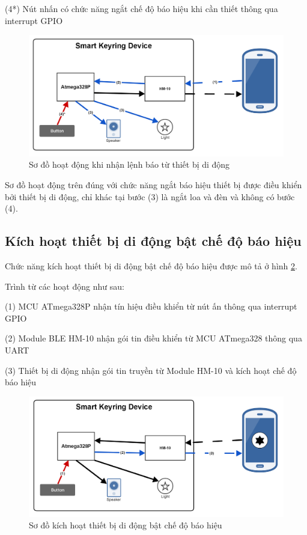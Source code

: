 (4*) Nút nhấn có chức năng ngắt chế độ báo hiệu khi cần thiết thông qua interrupt GPIO

\begin{figure}[h]
	\centering    
	\includegraphics[width=1.0\textwidth]{ring1}
	\caption[Sơ đồ hoạt động khi nhận lệnh báo từ thiết bị di động]{Sơ đồ hoạt động khi nhận lệnh báo từ thiết bị di động}
	\label{fig: ring1}
\end{figure}

Sơ đồ hoạt động trên đúng với chức năng ngắt báo hiệu thiết bị được điều khiển bởi thiết bị di động, chỉ khác tại bước (3) là ngắt loa và đèn và không có bước (4).
\subsection{Kích hoạt thiết bị di động bật chế độ báo hiệu}

Chức năng kích hoạt thiết bị di động bật chế độ báo hiệu được mô tả ở hình \ref{fig: ring2}.

Trình từ các hoạt động như sau:

(1) MCU ATmega328P nhận tín hiệu điều khiển từ nút ấn thông qua interrupt GPIO

(2) Module BLE HM-10 nhận gói tin điều khiển từ MCU ATmega328 thông qua UART

(3) Thiết bị di động nhận gói tin truyền từ Module HM-10 và kích hoạt chế độ báo hiệu

\begin{figure}[h]
	\centering    
	\includegraphics[width=1.0\textwidth]{ring2}
	\caption[Sơ đồ kích hoạt thiết bị di động bật chế độ báo hiệu]{Sơ đồ kích hoạt thiết bị di động bật chế độ báo hiệu}
	\label{fig: ring2}
\end{figure}
\newpage

